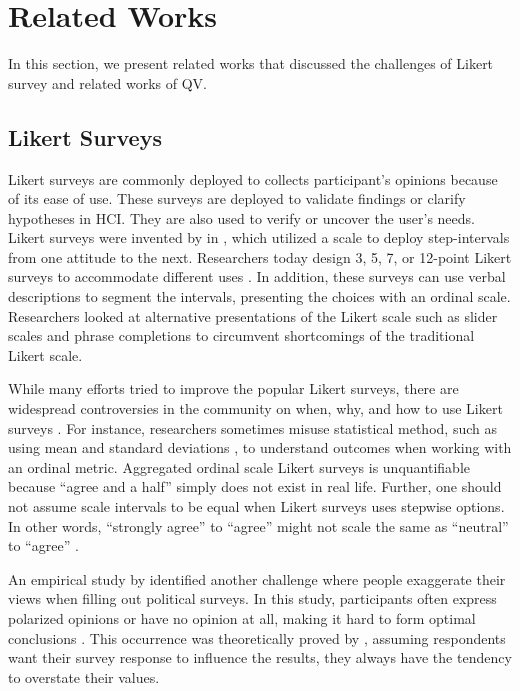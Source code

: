 \section{Related Works} \label{related_works}
In this section, 
we present related works
that discussed the challenges
of Likert survey
and related works of QV.

\subsection{Likert Surveys}
Likert surveys are commonly deployed
to collects participant's opinions
because of its ease of use.
These surveys are deployed
to validate findings or clarify hypotheses
\cite{ozok2009survey, ledo2018evaluation} in HCI.
They are also used to verify or uncover the user's needs.
Likert surveys were invented by \textcite{likert1932technique} 
in \citeyear{likert1932technique},
which utilized a scale to deploy step-intervals 
from one attitude to the next.
Researchers today design 3, 5, 7, 
or 12-point Likert surveys to accommodate different uses
\cite{garland2008computer,finstad2010}.
In addition, these surveys
can use verbal descriptions
to segment the intervals,
presenting the choices with an ordinal scale.
Researchers looked at
alternative presentations of the Likert scale
such as slider scales \cite{roster2015exploring} 
and phrase completions \cite{hodge2003phrase}
to circumvent shortcomings of the traditional Likert scale.

While many efforts tried to
improve the popular Likert surveys,
there are widespread controversies in the community on
when, why, and how to use Likert surveys \cite{bishop2015use}.
For instance, 
researchers sometimes misuse statistical method,
such as using mean and standard deviations \cite{jamieson2004likert},
to understand outcomes
when working with an ordinal metric.
Aggregated ordinal scale Likert surveys is 
unquantifiable because ``agree and a half'' 
simply does not exist in real life.
Further, 
one should not assume scale intervals to be equal
when Likert surveys uses stepwise options.
In other words,
``strongly agree'' to ``agree''
might not scale the same as 
``neutral'' to ``agree'' 
\cite{jamieson2004likert, edmondson2005likert}.

An empirical study by \textcite{quarfoot2017quadratic}
identified another challenge
where people exaggerate their views
when filling out political surveys.
In this study,
participants often express polarized opinions
or have no opinion at all,
making it hard to form optimal conclusions \cite{posner2018radical}.
This occurrence was 
theoretically proved by \textcite{cavaille2018towards},
assuming respondents want their survey response
to influence the results,
they always have the tendency to overstate their values.

